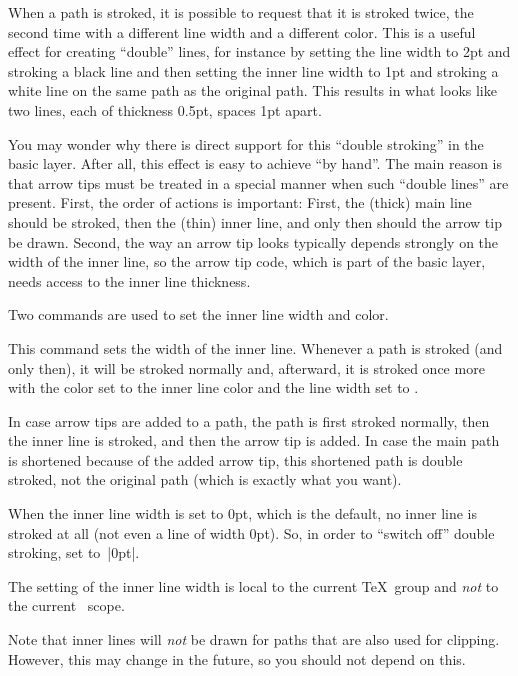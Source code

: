 When a path is stroked, it is possible to request that it is stroked
twice, the second time with a different line width and a different
color. This is a useful effect for creating ``double'' lines, for
instance by setting the line width to 2pt and stroking a black line
and then setting the inner line width to 1pt and stroking a white
line on the same path as the original path. This results in what looks
like two lines, each of thickness 0.5pt, spaces 1pt apart.

You may wonder why there is direct support for this ``double
stroking'' in the basic layer. After all, this effect is easy to
achieve ``by hand''. The main reason is that arrow tips must be
treated in a special manner when such ``double lines'' are
present. First, the order of actions is important: First, the (thick)
main line should be stroked, then the (thin) inner line, and only then
should the arrow tip be drawn. Second, the way an arrow tip looks
typically depends strongly on the width of the inner line, so the
arrow tip code, which is part of the basic layer, needs access to the
inner line thickness.

Two commands are used to set the inner line width and color.

\begin{command}{\pgfsetinnerlinewidth{}}
  This command sets the width of the inner line. Whenever a path is
  stroked (and only then), it will be stroked normally and, afterward,
  it is stroked once more with the color set to the inner line color
  and the line width set to .

  In case arrow tips are added to a path, the path is first stroked
  normally, then the inner line is stroked, and then the arrow tip is
  added. In case the main path is shortened because of the added arrow
  tip, this shortened path is double stroked, not the original path
  (which is exactly what you want).

  When the inner line width is set to 0pt, which is the default, no
  inner line is stroked at all (not even a line of width 0pt). So, in
  order to ``switch off'' double stroking, set 
  to~|0pt|.

  The setting of the inner line width is local to the current \TeX\
  group and \emph{not} to the current \pgfname\ scope.

  Note that inner lines will \emph{not} be drawn for paths that are
  also used for clipping. However, this may change in the future, so
  you should not depend on this.

\begin{codeexample}[]
\begin{pgfpicture}
  \pgfpathmoveto{\pgfpointorigin}
  \pgfpathlineto{\pgfpoint{1cm}{1cm}}
  \pgfpathlineto{\pgfpoint{1cm}{0cm}}
  \pgfsetlinewidth{2pt}
  \pgfsetinnerlinewidth{1pt}
\end{pgfpicture}
\end{codeexample}  
\end{command}


